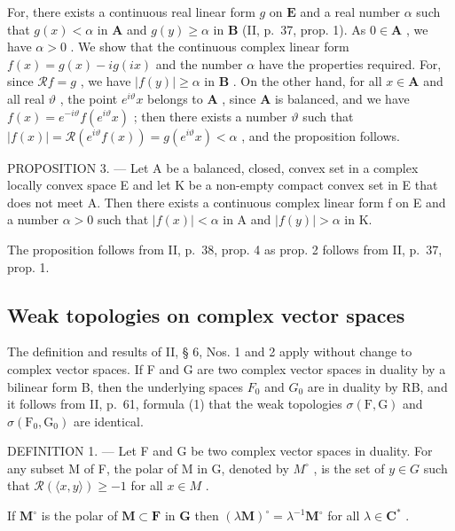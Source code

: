 For, there exists a continuous real linear form \(g\) on \(\mathbf{E}\) and a real number \(\alpha\) such that \(g(x) < \alpha\) in \(\mathbf{A}\) and \(g(y) \geqslant \alpha\) in \(\mathbf{B}\) (II, p.~37, prop. 1). As \(0 \in \mathbf{A}\) , we have \(\alpha > 0\) . We show that the continuous complex linear form \(f(x) = g(x) - ig(ix)\) and the number \(\alpha\) have the properties required. For, since \(\mathcal{R}f = g\) , we have \(|f(y)| \geqslant \alpha\) in \(\mathbf{B}\) . On the other hand, for all \(x \in \mathbf{A}\) and all real \(\vartheta\) , the point \(e^{i\vartheta}x\) belongs to \(\mathbf{A}\) , since \(\mathbf{A}\) is balanced, and we have \(f(x) = e^{-i\vartheta}f(e^{i\vartheta}x)\) ; then there exists a number \(\vartheta\) such that \(|f(x)| = \mathcal{R}(e^{i\vartheta}f(x)) = g(e^{i\vartheta}x) < \alpha\) , and the proposition follows.

PROPOSITION 3. --- Let A be a balanced, closed, convex set in a complex locally convex space E and let K be a non-empty compact convex set in E that does not meet A. Then there exists a continuous complex linear form f on E and a number \(\alpha > 0\) such that \(|f(x)| < \alpha\) in A and \(|f(y)| > \alpha\) in K.

The proposition follows from II, p.~38, prop. 4 as prop. 2 follows from II, p.~37, prop. 1.

\subsection{Weak topologies on complex vector spaces}

The definition and results of II, § 6, Nos. 1 and 2 apply without change to complex vector spaces. If F and G are two complex vector spaces in duality by a bilinear form B, then the underlying spaces \(F_{0}\) and \(G_{0}\) are in duality by RB, and it follows from II, p.~61, formula (1) that the weak topologies \(\sigma(\mathrm{F},\mathrm{G})\) and \(\sigma(\mathrm{F}_{0},\mathrm{G}_{0})\) are identical.

DEFINITION 1. --- Let F and G be two complex vector spaces in duality. For any subset M of F, the polar of M in G, denoted by \(M^{\circ}\) , is the set of \(y \in G\) such that \(\mathcal{R}(\langle x, y \rangle) \geqslant -1\) for all \(x \in M\) .

If \(\mathbf{M}^{\circ}\) is the polar of \(\mathbf{M} \subset \mathbf{F}\) in \(\mathbf{G}\) then \((\lambda \mathbf{M})^{\circ} = \lambda^{-1}\mathbf{M}^{\circ}\) for all \(\lambda \in \mathbf{C}^{*}\) .

